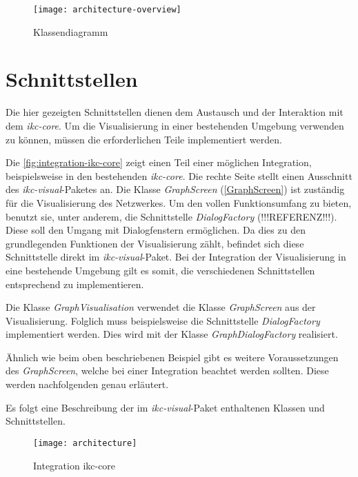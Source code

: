 \begin{landscape}

\begin{figure}[htbp]
\centering
\texttt{[image: architecture-overview]}
\caption{Klassendiagramm}
\label{fig:klassendiagramm}
\end{figure}
\end{landscape}


\section{Schnittstellen} \label{schnittstellen}

Die hier gezeigten Schnittstellen dienen dem Austausch und der Interaktion mit dem \textit{ikc-core}. Um die Visualisierung in einer bestehenden Umgebung verwenden zu können, müssen die erforderlichen Teile implementiert werden.

Die \autoref{fig:integration-ikc-core} zeigt einen Teil einer möglichen Integration, beispielsweise in den bestehenden \textit{ikc-core}. Die rechte Seite stellt einen Ausschnitt des \textit{ikc-visual}-Paketes an. Die Klasse \textit{GraphScreen} (\autoref{GraphScreen}) ist zu\-stä\-ndig für die Visualisierung des Netzwerkes. Um den vollen Funktionsumfang zu bieten, benutzt sie, unter anderem, die Schnittstelle \textit{DialogFactory} (!!!REFERENZ!!!). Diese soll den Umgang mit Dialogfenstern ermöglichen. Da dies zu den grundlegenden Funktionen der Visualisierung zählt, befindet sich diese Schnittstelle direkt im \textit{ikc-visual}-Paket. Bei der Integration der Visualisierung in eine bestehende Umgebung gilt es somit, die verschiedenen Schnittstellen entsprechend zu implementieren.

Die Klasse \textit{GraphVisualisation} verwendet die Klasse \textit{GraphScreen} aus der Visualisierung. Folglich muss beispielsweise die Schnittstelle \textit{DialogFactory} implementiert werden. Dies wird mit der Klasse \textit{GraphDialogFactory} realisiert.

Ähnlich wie beim oben beschriebenen Beispiel gibt es weitere Voraussetzungen des \textit{GraphScreen}, welche bei einer Integration beachtet werden sollten. Diese werden nachfolgenden genau erläutert.


Es folgt eine Beschreibung der im \textit{ikc-visual}-Paket enthaltenen Klassen und Schnittstellen. 
\begin{figure}[htbp]
\centering
\texttt{[image: architecture]}
\caption{Integration ikc-core}
\label{fig:integration-ikc-core}
\end{figure}


